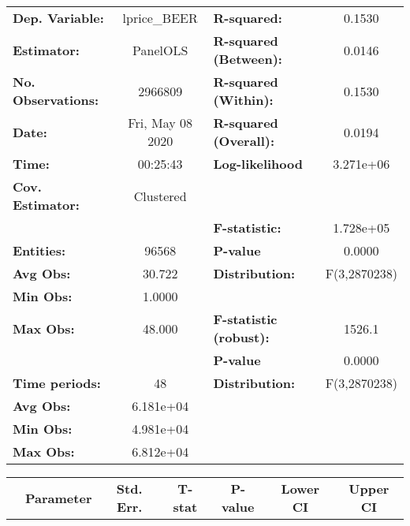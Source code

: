 \documentclass{report}
\begin{document}
\begin{center}
\begin{tabular}{lclc}
\toprule
\textbf{Dep. Variable:}    &    lprice\_BEER    & \textbf{  R-squared:         }   &      0.1530      \\
\textbf{Estimator:}        &      PanelOLS      & \textbf{  R-squared (Between):}  &      0.0146      \\
\textbf{No. Observations:} &      2966809       & \textbf{  R-squared (Within):}   &      0.1530      \\
\textbf{Date:}             &  Fri, May 08 2020  & \textbf{  R-squared (Overall):}  &      0.0194      \\
\textbf{Time:}             &      00:25:43      & \textbf{  Log-likelihood     }   &    3.271e+06     \\
\textbf{Cov. Estimator:}   &     Clustered      & \textbf{                     }   &                  \\
\textbf{}                  &                    & \textbf{  F-statistic:       }   &    1.728e+05     \\
\textbf{Entities:}         &       96568        & \textbf{  P-value            }   &      0.0000      \\
\textbf{Avg Obs:}          &       30.722       & \textbf{  Distribution:      }   &   F(3,2870238)   \\
\textbf{Min Obs:}          &       1.0000       & \textbf{                     }   &                  \\
\textbf{Max Obs:}          &       48.000       & \textbf{  F-statistic (robust):} &      1526.1      \\
\textbf{}                  &                    & \textbf{  P-value            }   &      0.0000      \\
\textbf{Time periods:}     &         48         & \textbf{  Distribution:      }   &   F(3,2870238)   \\
\textbf{Avg Obs:}          &     6.181e+04      & \textbf{                     }   &                  \\
\textbf{Min Obs:}          &     4.981e+04      & \textbf{                     }   &                  \\
\textbf{Max Obs:}          &     6.812e+04      & \textbf{                     }   &                  \\
\bottomrule
\end{tabular}
\begin{tabular}{lcccccc}
                           & \textbf{Parameter} & \textbf{Std. Err.} & \textbf{T-stat} & \textbf{P-value} & \textbf{Lower CI} & \textbf{Upper CI}  \\

\end{tabular}
\end{center}
\end{document}
